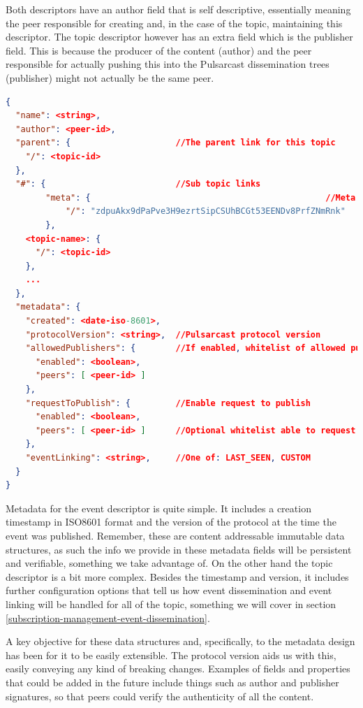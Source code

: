 Both descriptors have an author field that is self descriptive, essentially
meaning the peer responsible for creating and, in the case of the topic,
maintaining this descriptor. The topic descriptor however has an extra field
which is the publisher field. This is because the producer of the content
(author) and the peer responsible for actually pushing this into the Pulsarcast
dissemination trees (publisher) might not actually be the same peer.

\noindent\begin{minipage}{\textwidth}
\vspace{8pt}
\begin{lstlisting}[language=JSON,caption={Topic descriptor schema in a JSON based format},label={topic-descriptor}]
{
  "name": <string>,
  "author": <peer-id>,
  "parent": {                     //The parent link for this topic
    "/": <topic-id>
  },
  "#": {                          //Sub topic links
		"meta": {												//Meta topic
			"/": "zdpuAkx9dPaPve3H9ezrtSipCSUhBCGt53EENDv8PrfZNmRnk"
		},
    <topic-name>: {
      "/": <topic-id>
    },
    ...
  },
  "metadata": {
    "created": <date-iso-8601>,
    "protocolVersion": <string>,  //Pulsarcast protocol version
    "allowedPublishers": {        //If enabled, whitelist of allowed publishers
      "enabled": <boolean>,
      "peers": [ <peer-id> ]
    },
    "requestToPublish": {         //Enable request to publish
      "enabled": <boolean>,
      "peers": [ <peer-id> ]      //Optional whitelist able to request
    },
    "eventLinking": <string>,     //One of: LAST_SEEN, CUSTOM
  }
}
\end{lstlisting}
\vspace{8pt}
\end{minipage}

Metadata for the event descriptor is quite simple. It includes a creation
timestamp in ISO8601 format and the version of the protocol at the time the
event was published. Remember, these are content addressable immutable data
structures, as such the info we provide in these metadata fields will be
persistent and verifiable, something we take advantage of. On the other hand
the topic descriptor is a bit more complex. Besides the timestamp and version,
it includes further configuration options that tell us how event dissemination
and event linking will be handled for all of the topic, something we will cover
in section \ref{subscription-management-event-dissemination}.

A key objective for these data structures and, specifically, to the metadata
design has been for it to be easily extensible. The protocol version aids us
with this, easily conveying any kind of breaking changes. Examples of fields
and properties that could be added in the future include things such as author
and publisher signatures, so that peers could verify the authenticity of all
the content.

